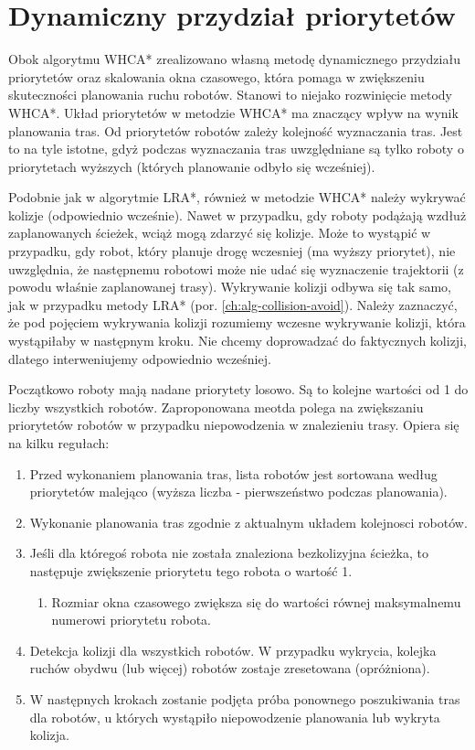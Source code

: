 \section{Dynamiczny przydział priorytetów}
\label{ch:alg-priorities-allocation}

Obok algorytmu WHCA* zrealizowano własną metodę dynamicznego przydziału priorytetów oraz skalowania okna czasowego, która pomaga w zwiększeniu skuteczności planowania ruchu robotów. Stanowi to niejako rozwinięcie metody WHCA*.
Układ priorytetów w metodzie WHCA* ma znaczący wpływ na wynik planowania tras. Od priorytetów robotów zależy kolejność wyznaczania tras.
Jest to na tyle istotne, gdyż podczas wyznaczania tras uwzględniane są tylko roboty o priorytetach wyższych (których planowanie odbyło się wcześniej).

Podobnie jak w algorytmie LRA*, również w metodzie WHCA* należy wykrywać kolizje (odpowiednio wcześnie).
Nawet w przypadku, gdy roboty podążają wzdłuż zaplanowanych ścieżek, wciąż mogą zdarzyć się kolizje.
Może to wystąpić w przypadku, gdy robot, który planuje drogę wczesniej (ma wyższy priorytet), nie uwzględnia, że następnemu robotowi może nie udać się wyznaczenie trajektorii (z powodu właśnie zaplanowanej trasy).
Wykrywanie kolizji odbywa się tak samo, jak w przypadku metody LRA* (por. \ref{ch:alg-collision-avoid}).
Należy zaznaczyć, że pod pojęciem wykrywania kolizji rozumiemy wczesne wykrywanie kolizji, która wystąpiłaby w następnym kroku. Nie chcemy doprowadzać do faktycznych kolizji, dlatego interweniujemy odpowiednio wcześniej.


Początkowo roboty mają nadane priorytety losowo. Są to kolejne wartości od 1 do liczby wszystkich robotów.
Zaproponowana meotda polega na zwiększaniu priorytetów robotów w przypadku niepowodzenia w znalezieniu trasy.
Opiera się na kilku regułach:
\begin{enumerate}
	\item Przed wykonaniem planowania tras, lista robotów jest sortowana według priorytetów malejąco (wyższa liczba - pierwszeństwo podczas planowania).
	\item Wykonanie planowania tras zgodnie z aktualnym układem kolejnosci robotów.
	\item Jeśli dla któregoś robota nie została znaleziona bezkolizyjna ścieżka, to następuje zwiększenie priorytetu tego robota o wartość 1.
	\begin{enumerate}
		\item Rozmiar okna czasowego zwiększa się do wartości równej maksymalnemu numerowi priorytetu robota.
	\end{enumerate}
	\item Detekcja kolizji dla wszystkich robotów. W przypadku wykrycia, kolejka ruchów obydwu (lub więcej) robotów zostaje zresetowana (opróżniona).
	\item W następnych krokach zostanie podjęta próba ponownego poszukiwania tras dla robotów, u których wystąpiło niepowodzenie planowania lub wykryta kolizja.
\end{enumerate}

